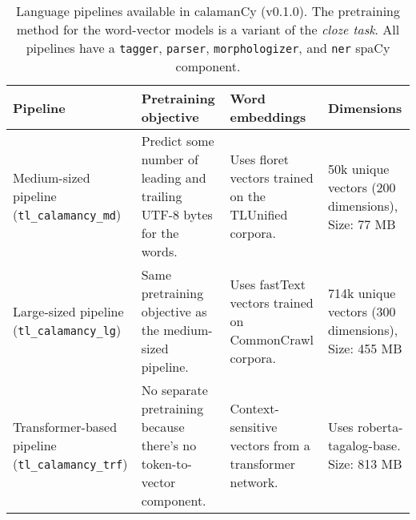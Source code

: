 \documentclass[../emnlp2023.tex]{subfiles}
\begin{document}
\begin{table*}[t]
\begin{tabular}{@{}p{3cm}p{4cm}p{4cm}p{4cm}@{}}
\toprule
Pipeline  &  Pretraining objective & Word embeddings & Dimensions \\ \midrule
Medium-sized pipeline (\texttt{tl\_calamancy\_md}) & Predict some number of leading and trailing UTF-8 bytes for the words. & Uses floret vectors trained on the TLUnified corpora. & 50k unique vectors (200 dimensions), Size: 77 MB\\
Large-sized pipeline (\texttt{tl\_calamancy\_lg})  & Same pretraining objective as the medium-sized pipeline.    & Uses fastText vectors trained on CommonCrawl corpora.                  & 714k unique vectors (300 dimensions), Size: 455 MB \\
Transformer-based pipeline (\texttt{tl\_calamancy\_trf}) & No separate pretraining because there's no token-to-vector component. & Context-sensitive vectors from a transformer network.      & Uses roberta-tagalog-base. Size: 813 MB  \\ \bottomrule
\end{tabular}
\caption{
    Language pipelines available in calamanCy (v0.1.0).
    The pretraining method for the word-vector models is a variant of the \textit{cloze task}.
    All pipelines have a \texttt{tagger}, \texttt{parser}, \texttt{morphologizer}, and \texttt{ner} spaCy component.
}
\label{table:calamancy_pipelines}
\end{table*}
\end{document}
